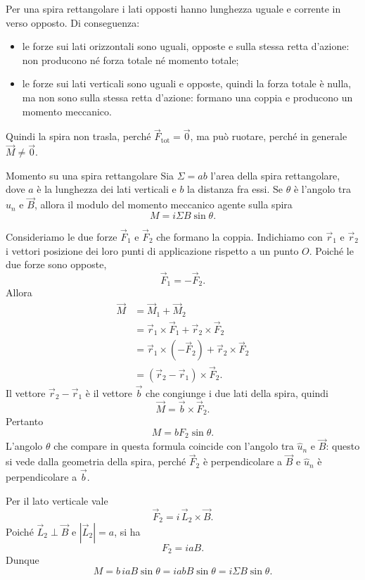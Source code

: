 \documentclass[a4paper]{article}
\begin{document}
Per una spira rettangolare i lati opposti hanno lunghezza uguale e corrente in verso opposto. Di conseguenza:

\begin{itemize}
    \item le forze sui lati orizzontali sono uguali, opposte e sulla stessa retta d'azione: non producono né forza totale né momento totale;
    \item le forze sui lati verticali sono uguali e opposte, quindi la forza totale è nulla, ma non sono sulla stessa retta d'azione: formano una coppia e producono un momento meccanico.
\end{itemize}

Quindi la spira non trasla, perché \(\vec{F}_{\text{tot}}=\vec{0}\), ma può ruotare, perché in generale \(\vec{M}\neq\vec{0}\).

\begin{snippetproposition}{Momento su una spira rettangolare}
    Sia \(\Sigma=ab\) l'area della spira rettangolare, dove \(a\) è la lunghezza dei lati verticali e \(b\) la distanza fra essi. Se \(\theta\) è l'angolo tra \(\hat{u}_n\) e \(\vec{B}\), allora il modulo del momento meccanico agente sulla spira
    \[
        M=i\Sigma B\sin\theta.
    \]
\end{snippetproposition}

\begin{snippetproof}{}
    Consideriamo le due forze \(\vec{F}_1\) e \(\vec{F}_2\) che formano la coppia. Indichiamo con \(\vec{r}_1\) e \(\vec{r}_2\) i vettori posizione dei loro punti di applicazione rispetto a un punto \(O\). Poiché le due forze sono opposte,
    \[
        \vec{F}_1=-\vec{F}_2.
    \]
    Allora
    \begin{align*}
        \vec{M}
        &=\vec{M}_1+\vec{M}_2 \\
        &=\vec{r}_1\times\vec{F}_1+\vec{r}_2\times\vec{F}_2 \\
        &=\vec{r}_1\times(-\vec{F}_2)+\vec{r}_2\times\vec{F}_2 \\
        &=(\vec{r}_2-\vec{r}_1)\times\vec{F}_2.
    \end{align*}
    Il vettore \(\vec{r}_2-\vec{r}_1\) è il vettore \(\vec{b}\) che congiunge i due lati della spira, quindi
    \[
        \vec{M}=\vec{b}\times\vec{F}_2.
    \]
    Pertanto
    \[
        M=bF_2\sin\theta.
    \]
    L'angolo \(\theta\) che compare in questa formula coincide con l'angolo tra \(\hat{u}_n\) e \(\vec{B}\): questo si vede dalla geometria della spira, perché \(\vec{F}_2\) è perpendicolare a \(\vec{B}\) e \(\hat{u}_n\) è perpendicolare a \(\vec{b}\).

    Per il lato verticale vale
    \[
        \vec{F}_2=i\,\vec{L}_2\times\vec{B}.
    \]
    Poiché \(\vec{L}_2\perp\vec{B}\) e \(\left|\vec{L}_2\right|=a\), si ha
    \[
        F_2=iaB.
    \]
    Dunque
    \[
        M=b\,iaB\sin\theta=iabB\sin\theta=i\Sigma B\sin\theta.
    \]
\end{snippetproof}
\end{document}
